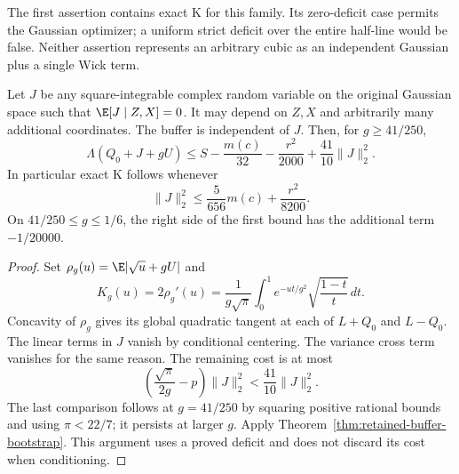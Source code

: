 The first assertion contains exact K for this family. Its zero-deficit
case permits the Gaussian optimizer; a uniform strict deficit over
the entire half-line would be false. Neither assertion represents an
arbitrary cubic as an independent Gaussian plus a single Wick term.

\begin{corollary}
\label{cor:bootstrap-complement}
Let \(J\) be any square-integrable complex random variable on the
original Gaussian space such that
\(\E[J\mid Z,X]=0\). It may depend on \(Z,X\) and arbitrarily many
additional coordinates. The buffer is independent of \(J\). Then,
for \(g\ge41/250\),
\[
 \boxed{\Lambda(Q_0+J+gU)\le
 S-\frac{m(c)}{32}-\frac{r^2}{2000}
                         +\frac{41}{10}\|J\|_2^2.}
\]
In particular exact K follows whenever
\[
 \|J\|_2^2\le \frac5{656}m(c)+\frac{r^2}{8200}.
\]
On \(41/250\le g\le1/6\), the right side of the first bound has
the additional term \(-1/20000\).
\end{corollary}
\begin{proof}
Set \(\rho_g(u)=\E|\sqrt u+gU|\) and
\[
 K_g(u)=2\rho_g'(u)
 =\frac1{g\sqrt\pi}\int_0^1e^{-ut/g^2}
                       \sqrt{\frac{1-t}{t}}\,dt .
\]
Concavity of \(\rho_g\) gives its global quadratic tangent at each
of \(L+Q_0\) and \(L-Q_0\). The linear terms in \(J\) vanish by
conditional centering. The variance cross term vanishes for the
same reason. The remaining cost is at most
\[
 \left(\frac{\sqrt\pi}{2g}-p\right)\|J\|_2^2
 <\frac{41}{10}\|J\|_2^2 .
\]
The last comparison follows at \(g=41/250\) by squaring positive
rational bounds and using \(\pi<22/7\); it persists at larger \(g\).
Apply Theorem~\ref{thm:retained-buffer-bootstrap}.
This argument uses a proved deficit and does not discard its cost
when conditioning.
\end{proof}

